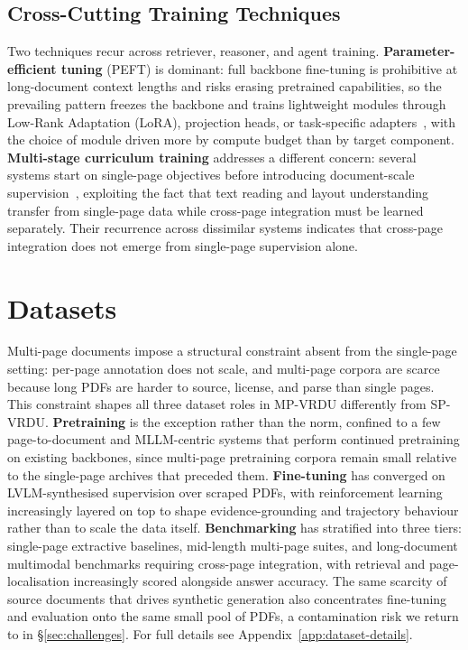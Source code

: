 \documentclass[11pt]{article}
\begin{document}
\subsection{Cross-Cutting Training Techniques}
\label{sec:train-crosscutting}
Two techniques recur across retriever, reasoner, and agent training. \textbf{Parameter-efficient tuning} (PEFT) is dominant: full backbone fine-tuning is prohibitive at long-document context lengths and risks erasing pretrained capabilities, so the prevailing pattern freezes the backbone and trains lightweight modules through Low-Rank Adaptation (LoRA), projection heads, or task-specific adapters~\cite{zhang2024cream, qian2026accurate, zhang2026docdancer}, with the choice of module driven more by compute budget than by target component. \textbf{Multi-stage curriculum training} addresses a different concern: several systems start on single-page objectives before introducing document-scale supervision~\cite{hu2025mplug2, hannan2025docslm, xiong2026docr1}, exploiting the fact that text reading and layout understanding transfer from single-page data while cross-page integration must be learned separately. Their recurrence across dissimilar systems indicates that cross-page integration does not emerge from single-page supervision alone.

\section{Datasets}
\label{sec:datasets}
Multi-page documents impose a structural constraint absent from the single-page setting: per-page annotation does not scale, and multi-page corpora are scarce because long PDFs are harder to source, license, and parse than single pages. This constraint shapes all three dataset roles in MP-VRDU differently from SP-VRDU. \textbf{Pretraining} is the exception rather than the norm, confined to a few page-to-document and MLLM-centric systems that perform continued pretraining on existing backbones, since multi-page pretraining corpora remain small relative to the single-page archives that preceded them. \textbf{Fine-tuning} has converged on LVLM-synthesised supervision over scraped PDFs, with reinforcement learning increasingly layered on top to shape evidence-grounding and trajectory behaviour rather than to scale the data itself. \textbf{Benchmarking} has stratified into three tiers: single-page extractive baselines, mid-length multi-page suites, and long-document multimodal benchmarks requiring cross-page integration, with retrieval and page-localisation increasingly scored alongside answer accuracy. The same scarcity of source documents that drives synthetic generation also concentrates fine-tuning and evaluation onto the same small pool of PDFs, a contamination risk we return to in \S\ref{sec:challenges}. For full details see Appendix~\ref{app:dataset-details}.
\end{document}
